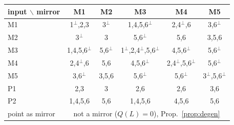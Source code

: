 \begin{tabular}{l|ccccc}\toprule input $\backslash$ mirror & \textsf{M1} & \textsf{M2} & \textsf{M3} & \textsf{M4} & \textsf{M5}\\\midrule
\textsf{M1} & 1$^\perp$,2,3 & 3$^\perp$ & 1,4,5,6$^\perp$ & 2,4$^\perp$,6 & 3,6$^\perp$\\
\textsf{M2} & 3$^\perp$ & 3 & 5,6$^\perp$ & 5,6 & 3,5,6\\
\textsf{M3} & 1,4,5,6$^\perp$ & 5,6$^\perp$ & 1$^\perp$,2,4$^\perp$,5,6$^\perp$ & 4,5,6$^\perp$ & 5,6$^\perp$\\
\textsf{M4} & 2,4$^\perp$,6 & 5,6 & 4,5,6$^\perp$ & 2,4$^\perp$,5,6$^\perp$ & 5,6$^\perp$\\
\textsf{M5} & 3,6$^\perp$ & 3,5,6 & 5,6$^\perp$ & 5,6$^\perp$ & 3$^\perp$,5,6$^\perp$\\
\textsf{P1} & 2,3 & 3 & 2,6 & 2,6 & 3,6\\
\textsf{P2} & 1,4,5,6 & 5,6 & 1,4,5,6 & 4,5,6 & 5,6\\
\midrule point as mirror & \multicolumn{5}{c}{not a mirror ($Q(L)=0$), Prop.~\ref{prop:degen}}\\\bottomrule\end{tabular}
